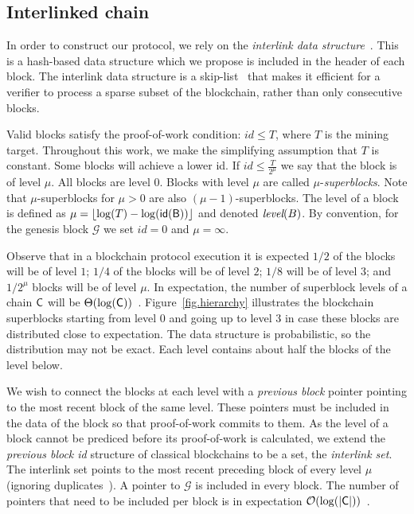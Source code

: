 \subsection{Interlinked chain}\label{sec.interlink}


In order to construct our protocol, we rely on the \emph{interlink data
structure}~\cite{popow}. This is a hash-based data structure which we propose is
included in the header of each block. The interlink data structure is a
skip-list~\cite{skiplist} that makes it efficient for a verifier to process a
sparse subset of the blockchain, rather than only consecutive blocks.

Valid blocks satisfy the proof-of-work condition: $id \leq T$, where $T$ is the
mining target. Throughout this work, we make the simplifying assumption that $T$
is constant.
Some blocks will achieve a lower id. If $id \leq
\frac{T}{2^\mu}$ we say that the block is of level $\mu$. All blocks are level
$0$. Blocks with level $\mu$ are called $\mu$-\emph{superblocks}.
Note that $\mu$-superblocks for $\mu > 0$ are also $(\mu - 1)$-superblocks. The level of a
block is defined as $\mu = \left \lfloor \log(T) - \log(\sf{id}(B)) \right
\rfloor$ and denoted $\emph{level}(B)$. By convention, for the genesis block
$\mathcal{G}$ we set $id = 0$ and $\mu = \infty$.

Observe that in a blockchain protocol execution it is expected $1/2$ of the
blocks will be of level $1$; $1/4$ of the blocks will be of level $2$; $1/8$
will be of level $3$; and $1/2^\mu$ blocks will be of level $\mu$. In
expectation, the number of superblock levels of a chain $\mathsf{C}$ will be
$\Theta(\log(\mathsf{C}))$~\cite{popow}. Figure~\ref{fig.hierarchy} illustrates the
blockchain superblocks starting from level $0$ and going up to level $3$ in case
these blocks are distributed close to expectation. The data structure is
probabilistic, so the distribution may not be exact. Each level
contains about half the blocks of the level below.

We wish to connect the blocks at each level with a \emph{previous block}
pointer pointing to the most recent block of the same level. These pointers must
be included in the data of the block so that proof-of-work commits to them. As
the level of a block cannot be prediced before its proof-of-work is calculated,
we extend the \emph{previous block id} structure of classical blockchains to be
a set, the \emph{interlink set}. The interlink set points to the most
recent preceding block of every level $\mu$ (ignoring
duplicates~\cite{gtklocker}). A pointer to $\mathcal{G}$ is included in every
block. The number of pointers that need to be included per block is in
expectation $\mathcal{O}(\log(|\mathsf{C}|))$~\cite{compactsuperblocks}.

